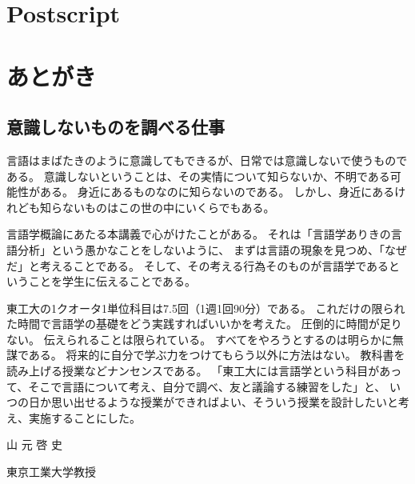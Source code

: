 \ifEnglish
\chapter*{Postscript}
\else
\chapter*{あとがき}
\fi

\section*{意識しないものを調べる仕事}

言語はまばたきのように意識してもできるが、日常では意識しないで使うものである。
意識しないということは、その実情について知らないか、不明である可能性がある。
身近にあるものなのに知らないのである。
しかし、身近にあるけれども知らないものはこの世の中にいくらでもある。

言語学概論にあたる本講義で心がけたことがある。
それは「言語学ありきの言語分析」という愚かなことをしないように、
まずは言語の現象を見つめ、「なぜだ」と考えることである。
そして、その考える行為そのものが言語学であるということを学生に伝えることである。

東工大の1クオータ1単位科目は7.5回（1週1回90分）である。
これだけの限られた時間で言語学の基礎をどう実践すればいいかを考えた。
圧倒的に時間が足りない。
伝えられることは限られている。
すべてをやろうとするのは明らかに無謀である。
将来的に自分で学ぶ力をつけてもらう以外に方法はない。
教科書を読み上げる授業などナンセンスである。
「東工大には言語学という科目があって、そこで言語について考え、自分で調べ、友と議論する練習をした」と、
いつの日か思い出せるような授業ができればよい、そういう授業を設計したいと考え、実施することにした。

\vspace*{1\baselineskip}

\begin{flushright}
 {\large 山 元 啓 史}\hspace*{3zw}

 {\small

 東京工業大学教授\hspace*{2zw}
 
 
 }
\end{flushright}


\begin{comment}
\begin{enumerate}
 \item 授業は隣の人とのおしゃべりが中心、
 \item 毎回振り返りのレポート、
 \item 試験問題を学生自らが作り、
 \item 鉛筆を転がすような試験ではなく、
 \item 本質が議論できるよう口述試験を受け、
 \item テーマを自分で選び、
 \item 決められた作法で書くことを学び、
 \item 自分で何かを明らかにする、
 \item 徹底的に能動的でなければ参加できない形式にした。
\end{enumerate}
\end{comment}
